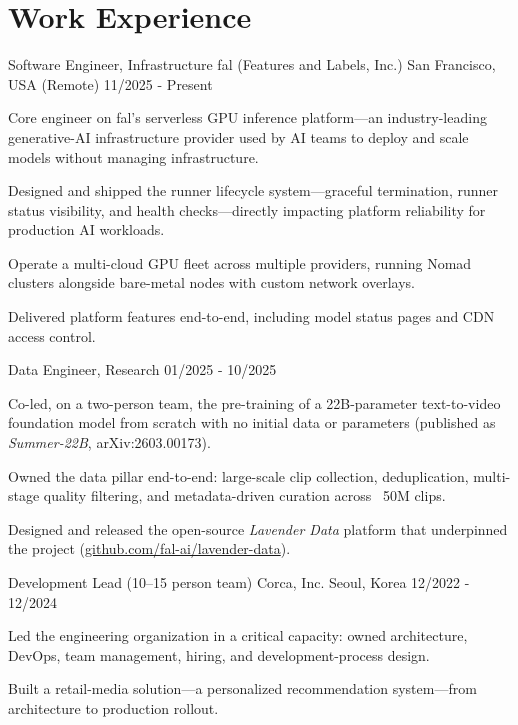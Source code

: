 \section{Work Experience}

\cventry
{Software Engineer, Infrastructure} %
{fal (Features and Labels, Inc.)} %
{San Francisco, USA (Remote)} %
{11/2025 - Present} %
\begin{cvitems}
\item {Core engineer on fal's serverless GPU inference platform---an industry-leading generative-AI infrastructure provider used by AI teams to deploy and scale models without managing infrastructure.}
\item {Designed and shipped the runner lifecycle system---graceful termination, runner status visibility, and health checks---directly impacting platform reliability for production AI workloads.}
\item {Operate a multi-cloud GPU fleet across multiple providers, running Nomad clusters alongside bare-metal nodes with custom network overlays.}
\item {Delivered platform features end-to-end, including model status pages and CDN access control.}
\end{cvitems}

\cventry
{Data Engineer, Research} %
{} %
{} %
{01/2025 - 10/2025} %
\begin{cvitems}
\item {Co-led, on a two-person team, the pre-training of a 22B-parameter text-to-video foundation model from scratch with no initial data or parameters (published as \emph{Summer-22B}, arXiv:2603.00173).}
\item {Owned the data pillar end-to-end: large-scale clip collection, deduplication, multi-stage quality filtering, and metadata-driven curation across ~50M clips.}
\item {Designed and released the open-source \emph{Lavender Data} platform that underpinned the project (\href{https://github.com/fal-ai/lavender-data}{github.com/fal-ai/lavender-data}).}
\end{cvitems}


\cventry
{Development Lead (10--15 person team)} %
{Corca, Inc.} %
{Seoul, Korea} %
{12/2022 - 12/2024} %
\begin{cvitems}
\item {Led the engineering organization in a critical capacity: owned architecture, DevOps, team management, hiring, and development-process design.}
\item {Built a retail-media solution---a personalized recommendation system---from architecture to production rollout.}
\end{cvitems}

